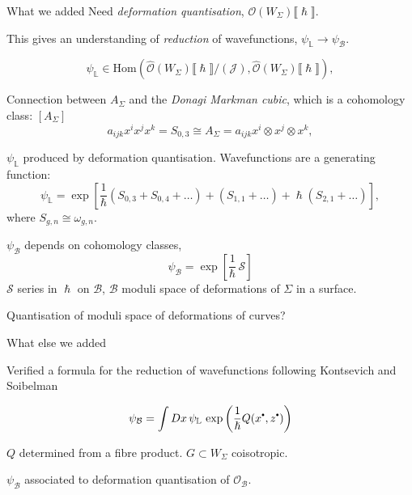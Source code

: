     \begin{frame}{What we added}
         Need \emph{deformation quantisation}, \( \mathcal{O}(W_\Sigma) \lBrack \hslash \rBrack \).
    
        This gives an understanding  of \emph{reduction} of {wavefunctions}, \( \psi_{\mathbb{L}}  \rightarrow \psi_{\mathcal{B}}\).
        
        \[ \psi_{\mathbb{L}} \in \text{Hom}\left( \widehat{\mathcal{O}}(W_\Sigma)\lBrack \hslash \rBrack / ( \mathcal{J} ) , \widehat{\mathcal{O}}(W_\Sigma)\lBrack \hslash \rBrack \right), \]
        
        Connection between \(A_\Sigma\) and the  \emph{Donagi Markman cubic}, which is a cohomology class: \([A_\Sigma]\)
    \[ a_{ijk} x^i x^j x^k  = S_{0,3} \cong A_\Sigma =  a_{ijk} x^i \otimes x^j \otimes x^k, \]

    \end{frame}

    \begin{frame} 
    \( \psi_{\mathbb{L}}\) produced by deformation quantisation. Wavefunctions are a generating function:
    \[ \psi_{\mathbb{L}} = \exp \left[ \frac{1}{\hslash} ( S_{0,3} +S_{0,4} + \dots ) + (  S_{1,1} + \dots ) + \hslash (  S_{2,1} + \dots ) \right], \]
    where \( S_{g,n} \cong \omega_{g,n}\). 
    
    \( \psi_{\mathcal{B}}\) depends on cohomology classes, 
    \[ \psi_{\mathcal{B}} = \exp \left[ \frac{1}{\hslash}\, \mathcal{S} \right] \]
    \( \mathcal{S}\) series in \(\hslash\) on \( \mathcal{B}\), \(\mathcal{B}\) moduli space of deformations of \(\Sigma\) in a surface.
    
    Quantisation of moduli space of deformations of curves?
    \end{frame}


    \begin{frame}{What else we added}
    
    Verified a formula for the reduction of wavefunctions following Kontsevich and Soibelman
    \begin{thm}
    \[ \psi_{\mathcal{B}} = \int D x\, \psi_{\mathbb{L}} \, \exp\left( \frac{1}{\hslash} Q(x^{\sbt}, z^{\sbt}) \right) \]
    \end{thm}
    \(Q\) determined from a fibre product. \(G \subset W_\Sigma\) coisotropic.
    \begin{center}
    \end{center}
    \( \psi_{\mathcal{B}}\) associated to deformation quantisation of \( \mathcal{O}_{\mathcal{B}}\).
    \end{frame}
    
